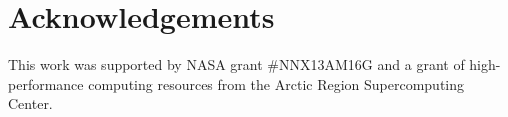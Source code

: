 \documentclass[twocolumn,letterpaper]{igs}
\begin{document}
\section*{Acknowledgements}
This work was supported by NASA grant \#NNX13AM16G and a grant of high-performance computing resources from the Arctic Region Supercomputing Center.






\begin{comment}
Here is what the MPAS Land-Ice User's Manual version 3.0 says:

\begin{quote}
\small
Velocities and fluxes are calculated on the midpoint of Voronoi cell edges.  The normal component of surface slope is calculated on cell edges using surface elevation at adjacent cell centers.  The tangential component of surface slope is calculated on cell edges using surface elevation at adjacent vertices. The surface elevation at vertices is calculated from the values at adjacent cell centers using barycentric interpolation. Ice thickness on edges is calculated as the average of the adjacent cell center values (2nd-order approximation).
\end{quote}

Looking at this, and the code, I don't think they think of it as Petrov-Galerkin
\end{comment}
\end{document}

